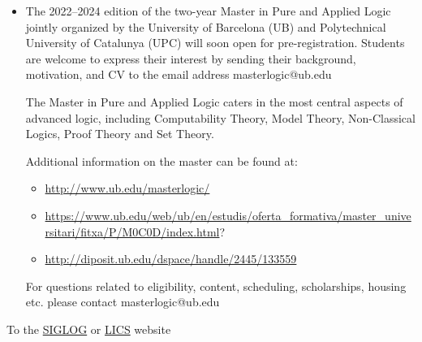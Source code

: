 \documentclass[prodmode,acmtecs]{acmsmall} %
\begin{document}
\begin{itemize}\item   The 2022--2024 edition of the two-year Master in Pure and Applied Logic jointly organized by the University of Barcelona (UB) and Polytechnical University of Catalunya (UPC) will soon open for pre-registration. Students are welcome to express their interest by sending their background, motivation, and CV to the email address masterlogic@ub.edu 
 
  The Master in Pure and Applied Logic caters in the most central aspects of advanced logic, including Computability Theory, Model Theory, Non-Classical Logics, Proof Theory and Set Theory. 
 
  Additional information on the master can be found at: 
 
\begin{itemize}\item  \href{http://www.ub.edu/masterlogic/}{http://www.ub.edu/masterlogic/}  
\item  \href{https://www.ub.edu/web/ub/en/estudis/oferta_formativa/master_universitari/fitxa/P/M0C0D/index.html}{https://www.ub.edu/web/ub/en/estudis/oferta\_formativa/master\_universitari/fitxa/P/M0C0D/index.html}? 
\item  \href{http://diposit.ub.edu/dspace/handle/2445/133559}{http://diposit.ub.edu/dspace/handle/2445/133559}
\end{itemize} 
  For questions related to eligibility, content, scheduling, scholarships, housing etc. please contact masterlogic@ub.edu 
 
\end{itemize}


To the \href{http://siglog.org/}{SIGLOG} or \href{https://lics.siglog.org}{LICS} website
\end{document}
